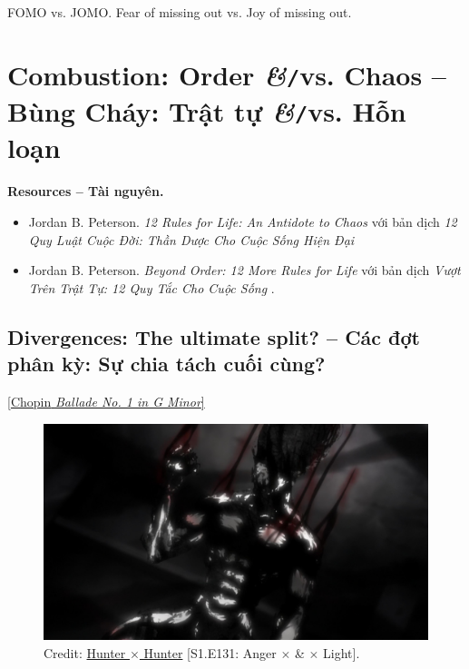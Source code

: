 \documentclass[12pt]{article}
\begin{document}
FOMO vs. JOMO. Fear of missing out vs. Joy of missing out.


\section{Combustion: Order {\it\&}{\tt/}vs. Chaos -- Bùng Cháy: Trật tự {\it\&}{\tt/}vs. Hỗn loạn}
\noindent\textbf{\textsf{Resources -- Tài nguyên.}}
\begin{itemize}
	\item {\sc Jordan B. Peterson}. {\it 12 Rules for Life: An Antidote to Chaos} \cite{Peterson2018} với bản dịch {\it 12 Quy Luật Cuộc Đời: Thần Dược Cho Cuộc Sống Hiện Đại} \cite{Peterson2022a}
	\item {\sc Jordan B. Peterson}. {\it Beyond Order: 12 More Rules for Life} \cite{Peterson2021} với bản dịch {\it Vượt Trên Trật Tự: 12 Quy Tắc Cho Cuộc Sống} \cite{Peterson2022b}.
\end{itemize}

\subsection{Divergences: The ultimate split? -- Các đợt phân kỳ: Sự chia tách cuối cùng?}
\begin{flushright}
	\href{https://www.youtube.com/watch?v=dIbeazAlxM4}{\small[{\sc Chopin} {\it Ballade No. 1 in G Minor}]}
\end{flushright}

\begin{figure}[H]
	\centering
	\includegraphics[scale=.1]{Gon_berserk}
	\caption{Credit: \href{https://www.imdb.com/title/tt3748420/}{Hunter $\times$ Hunter} [S1.E131: Anger $\times$ \& $\times$ Light].}
\end{figure}
\end{document}
